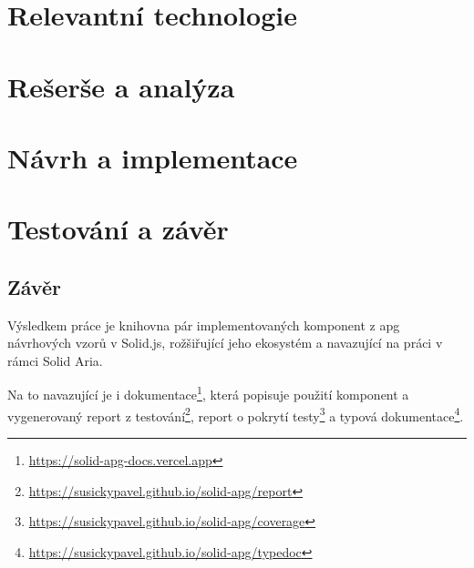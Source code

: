 \documentclass{ctuthesis}
\begin{document}

\maketitle



\part{Relevantní technologie}




\part{Rešerše a analýza}




\part{Návrh a implementace}




\part{Testování a závěr}



\chapter{Závěr}

Výsledkem práce je knihovna pár implementovaných komponent z \gls{apg} návrhových vzorů v Solid.js, rožšiřující jeho ekosystém a navazující na práci v rámci Solid Aria.

Na to navazující je i dokumentace\footnote{\url{https://solid-apg-docs.vercel.app}}, která popisuje použití komponent a vygenerovaný report z testování\footnote{\url{https://susickypavel.github.io/solid-apg/report}}, report o pokrytí testy\footnote{\url{https://susickypavel.github.io/solid-apg/coverage}} a typová dokumentace\footnote{\url{https://susickypavel.github.io/solid-apg/typedoc}}.
\end{document}
